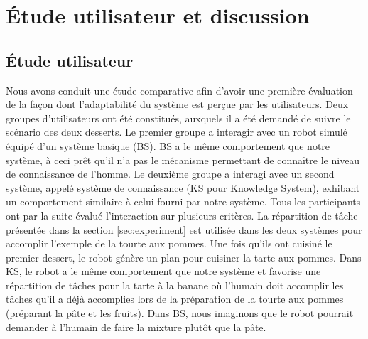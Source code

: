 \documentclass[a4paper,11pt,twoside]{StyleThese}
\begin{document}
\clearpage



 




\section{Étude utilisateur et discussion}
\label{study}

\subsection{Étude utilisateur}
Nous avons conduit une étude comparative afin d'avoir une première évaluation de la façon dont l'adaptabilité du système est perçue par les utilisateurs. Deux groupes d'utilisateurs ont été constitués, auxquels il a été demandé de suivre le scénario des deux desserts. Le premier groupe a interagir avec un robot simulé équipé d'un système basique (BS). BS a le même comportement que notre système, à ceci prêt qu'il n'a pas le mécanisme permettant de connaître le niveau de connaissance de l'homme. Le deuxième groupe a interagi avec un second système, appelé système de connaissance (KS pour Knowledge System), exhibant un comportement similaire à celui fourni par notre système.
Tous les participants ont par la suite évalué l'interaction sur plusieurs critères.
%
La répartition de tâche présentée dans la section \ref{sec:experiment} 
est utilisée dans les deux systèmes pour accomplir l'exemple de la tourte aux pommes. Une fois qu'ils ont cuisiné le premier dessert, le robot génère un plan pour cuisiner la tarte aux pommes. Dans KS, le robot a le même comportement que notre système et favorise une répartition de tâches pour la tarte à la banane où l'humain doit accomplir les tâches qu'il a déjà accomplies lors de la préparation de la tourte aux pommes (préparant la pâte et les fruits).
Dans BS, nous imaginons que le robot pourrait demander à l'humain de faire la mixture plutôt que la pâte.
\end{document}
